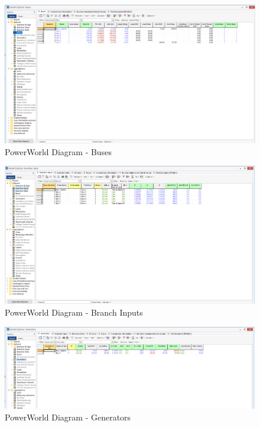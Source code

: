 \documentclass[12pt]{article}
\begin{document}
        \begin{figure}[H]
            \centerline{\includegraphics[scale=0.3]{images/PowerWorldTable1}}
            \caption{PowerWorld Diagram - Buses}
        \end{figure}
        \begin{figure}[H]
            \centerline{\includegraphics[scale=0.3]{images/PowerWorldTable2}}
            \caption{PowerWorld Diagram - Branch Inputs}
        \end{figure}
        \begin{figure}[H]
            \centerline{\includegraphics[scale=0.3]{images/PowerWorldTable3}}
            \caption{PowerWorld Diagram - Generators}
        \end{figure}
\end{document}
